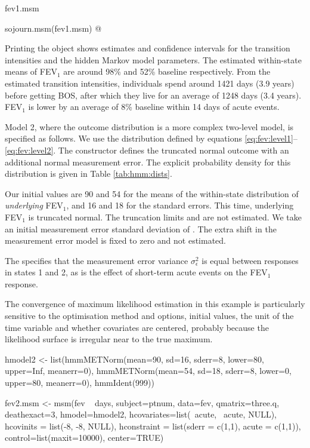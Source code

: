 fev1.msm

sojourn.msm(fev1.msm)
@


Printing the  object  shows estimates
and confidence intervals for the transition intensities and the
hidden Markov model parameters.  The estimated within-state means of
FEV$_1$ are around 98\% and 52\% baseline respectively.  From the
estimated transition intensities, individuals spend around 1421 days
(3.9 years) before getting BOS, after which they live for an average
of 1248 days (3.4 years).  FEV$_1$ is lower by an average of 8\%
baseline within 14 days of acute events.

Model 2, where the outcome distribution is a more complex two-level
model, is specified as follows.  We use the distribution defined by
equations \ref{eq:fev:level1}--\ref{eq:fev:level2}. The
 constructor defines the truncated normal
outcome with an additional normal measurement error.  The explicit
probability density for this distribution is given in
Table \ref{tab:hmm:dists}.

Our initial values are 90 and 54 for the means of the
within-state distribution of \emph{underlying} FEV$_1$, and 16 and 18
for the standard errors.  This time, underlying FEV$_1$ is truncated
normal. The truncation limits  and  are
not estimated.  We take an initial measurement error standard
deviation of . The extra shift  in
the measurement error model is fixed to zero and not estimated.

The  specifies that the measurement error
variance $\sigma^2_\epsilon$ is equal between responses in states 1
and 2, as is the effect of short-term acute events on the FEV$_1$
response.

The convergence of maximum likelihood estimation in this example is
particularly sensitive to the optimisation method and options, initial values,
the unit of the time variable and whether covariates are centered,
probably because the likelihood surface is irregular near to the
true maximum.

\begin{Scode}
hmodel2 <- list(hmmMETNorm(mean=90, sd=16, sderr=8,
                           lower=80, upper=Inf, meanerr=0),
                hmmMETNorm(mean=54, sd=18, sderr=8,
                           lower=0, upper=80, meanerr=0),
                hmmIdent(999))

fev2.msm <- msm(fev ~ days, subject=ptnum, data=fev, qmatrix=three.q,
                deathexact=3, hmodel=hmodel2,
                hcovariates=list(~acute, ~acute, NULL),
                hcovinits = list(-8, -8, NULL),
                hconstraint = list(sderr = c(1,1), acute = c(1,1)),
                control=list(maxit=10000), center=TRUE)
\end{Scode}

